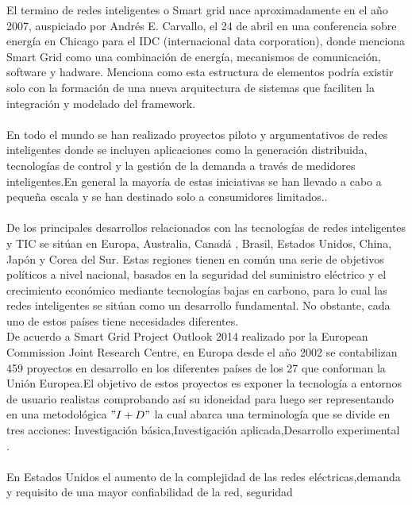 \documentclass[12pt,letterpaper]{article}
\begin{document}
El termino de redes inteligentes o Smart grid nace  aproximadamente en el año 2007, auspiciado por Andrés E. Carvallo, el 24 de abril en una conferencia sobre energía en Chicago para el IDC (internacional data corporation), donde menciona Smart Grid como una combinación de energía, mecanismos de comunicación, software y hadware. Menciona como esta estructura de elementos podría existir solo con la formación de una nueva arquitectura de sistemas que faciliten la integración y modelado del framework.\cite{Quintana2012}\cite{PeraltaSevilla2013}
\\
\\
 En todo el mundo se han realizado proyectos piloto y argumentativos de redes inteligentes donde se incluyen aplicaciones como la generación distribuida, tecnologías de control y la gestión de la demanda a través de medidores inteligentes.En general la mayoría de estas iniciativas se han llevado a cabo a pequeña escala y se han destinado solo a consumidores limitados.\cite{2554}. 
\\
\\
 De los principales desarrollos relacionados con las tecnologías de redes inteligentes  y TIC se sitúan en Europa, Australia, Canadá , Brasil, Estados Unidos, China, Japón y Corea del Sur. Estas regiones tienen en común una serie de objetivos políticos a nivel nacional, basados en la seguridad del suministro eléctrico y el crecimiento económico mediante tecnologías bajas en carbono, para lo cual las redes inteligentes se sitúan como un desarrollo fundamental. No obstante, cada uno de estos países tiene necesidades diferentes.
\cite{ColombiaInteligente2016} \cite{UPME2016} \cite{BancoInteramericanodeDesarrollo2016}
\\
 De  acuerdo  a  Smart  Grid  Project  Outlook  2014  realizado   por   la   European   Commission   Joint   Research  Centre,  en  Europa  desde  el  año  2002  se  contabilizan  459 proyectos  en  desarrollo  en  los diferentes países de los 27 que conforman la Unión Europea.El objetivo de estos proyectos es exponer la tecnología a entornos de usuario realistas comprobando así su idoneidad para luego ser  representando en  una metodológica $"I+D"$ la cual abarca una terminología que se divide en tres acciones: Investigación básica,Investigación aplicada,Desarrollo experimental \cite{Bucher2018}.
\\
\\
 En Estados Unidos el aumento de la complejidad de las redes eléctricas,demanda y requisito de una mayor confiabilidad de la red, seguridad
\end{document}

